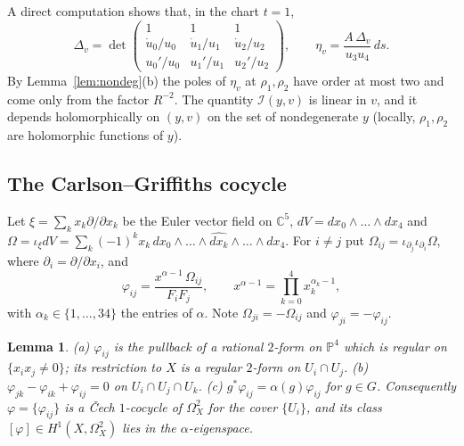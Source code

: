 \documentclass[11pt]{amsart}
\newtheorem{lemma}[theorem]{Lemma}
\theoremstyle{definition}
\theoremstyle{remark}
\numberwithin{equation}{section}
\newcommand{\C}{\mathbb{C}}
\newcommand{\PP}{\mathbb{P}}
\newcommand{\cI}{\mathcal{I}}
\begin{document}
A direct computation shows that, in the chart $t=1$,
\begin{equation}\label{eq:Delta}
\Delta_v=\det\left(\begin{array}{ccc}1&1&1\\ \dot u_0/u_0&\dot u_1/u_1&\dot u_2/u_2\\ u_0'/u_0&u_1'/u_1&u_2'/u_2\end{array}\right),\qquad \eta_v=\frac{A\,\Delta_v}{u_3u_4}\,ds .
\end{equation}
By Lemma~\ref{lem:nondeg}(b) the poles of $\eta_v$ at $\rho_1,\rho_2$ have order at most two and come only from the factor $R^{-2}$. The quantity $\cI(y,v)$ is linear in $v$, and it depends holomorphically on $(y,v)$ on the set of nondegenerate $y$ (locally, $\rho_1,\rho_2$ are holomorphic functions of $y$).

\subsection{The Carlson--Griffiths cocycle}\label{subsec:CG}
Let $\xi=\sum_kx_k\partial/\partial x_k$ be the Euler vector field on $\C^5$, $dV=dx_0\wedge\dots\wedge dx_4$ and $\Omega=\iota_{\xi}dV=\sum_k(-1)^kx_k\,dx_0\wedge\dots\wedge\widehat{dx_k}\wedge\dots\wedge dx_4$. For $i\ne j$ put $\Omega_{ij}=\iota_{\partial_j}\iota_{\partial_i}\Omega$, where $\partial_i=\partial/\partial x_i$, and
\[
\varphi_{ij}=\frac{x^{\alpha-1}\,\Omega_{ij}}{F_iF_j},\qquad x^{\alpha-1}=\prod_{k=0}^4x_k^{\alpha_k-1},
\]
with $\alpha_k\in\{1,\dots,34\}$ the entries of $\alpha$. Note $\Omega_{ji}=-\Omega_{ij}$ and $\varphi_{ji}=-\varphi_{ij}$.

\begin{lemma}\label{lem:cocycle}
(a) $\varphi_{ij}$ is the pullback of a rational $2$-form on $\PP^4$ which is regular on $\{x_ix_j\ne0\}$; its restriction to $X$ is a regular $2$-form on $U_i\cap U_j$.
(b) $\varphi_{jk}-\varphi_{ik}+\varphi_{ij}=0$ on $U_i\cap U_j\cap U_k$.
(c) $g^*\varphi_{ij}=\alpha(g)\varphi_{ij}$ for $g\in G$.
Consequently $\varphi=\{\varphi_{ij}\}$ is a \v{C}ech $1$-cocycle of $\Omega^2_X$ for the cover $\{U_i\}$, and its class $[\varphi]\in H^1(X,\Omega^2_X)$ lies in the $\alpha$-eigenspace.
\end{lemma}
\end{document}
